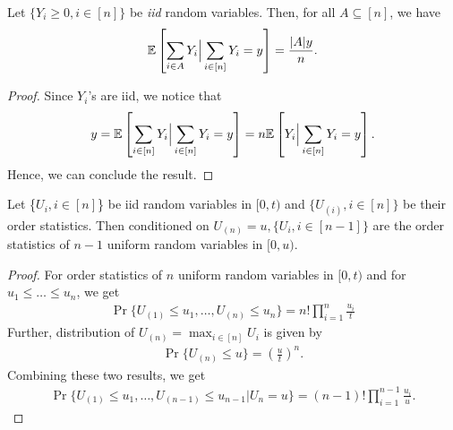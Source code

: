 \documentclass[a4paper,english,10pt]{article}
\begin{document}
\begin{lem}
\label{Lemma:Uniform}
Let $\{Y_i \geq 0,i \in [n]\}$ be \emph{iid} random variables. 
Then, for all $A \subseteq [n]$, we have
\begin{align*}
 \mathbb{E}\left[\sum_{i \in A}Y_i \Big| \sum_{i \in [n]}Y_i=y\right]=\frac{|A|y}{n}.
\end{align*}
\end{lem}
\begin{proof} Since $Y_i$'s are iid, we notice that
\begin{align*}
y = \mathbb{E}\left[\sum_{i \in [n]}Y_i \Big| \sum_{i \in [n]}Y_i=y\right] = n \mathbb{E}\left[Y_i \Big| \sum_{i \in [n]}Y_i=y\right].
\end{align*}
Hence, we can conclude the result.
\end{proof}

\begin{lem}
\label{Lemma:Reduction}
Let \{$U_i,i \in[n]$\} be iid random variables in $[0,t)$ and $\{U_{(i)},i \in [n]\}$ be their order statistics. Then conditioned on $U_{(n)}=u,\{U_i,i \in[n-1]\}$ are the order statistics of $n-1$ uniform random variables in $[0,u)$.
\end{lem}
\begin{proof}
For order statistics of $n$ uniform random variables in $[0,t)$ and for $u_1 \leq \ldots \leq u_n$, we get
\begin{align*}
\Pr\{U_{(1)} \leq u_1, \ldots, U_{(n)} \leq u_n\} = n!\prod_{i=1}^{n}\frac{u_i}{t}
\end{align*}
Further, distribution of $U_{(n)} = \max_{i \in [n]} U_i$ is given by 
\begin{align*}
\Pr\{U_{(n)} \leq u\} = \left(\frac{u}{t}\right)^n.
\end{align*}
Combining these two results, we get
\begin{align*}
\Pr\{U_{(1)} \leq u_1, \ldots, U_{(n-1)} \leq u_{n-1} | U_{n} = u\} = (n-1)!\prod_{i=1}^{n-1}\frac{u_i}{u}.
\end{align*}
\end{proof}
\end{document}
